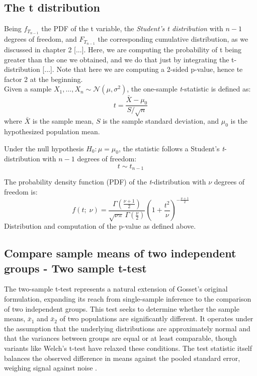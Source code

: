 \documentclass{book}
\begin{document}
\subsection*{The t distribution}

Being $f_{T_{n-1}}$ the PDF of the t variable, the \textit{Student's t distribution} with $n - 1$ degrees of freedom, and $F_{T_{n-1}}$ the corresponding cumulative distribution, as we discussed in chapter 2 [...]. Here, we are computing the probability of t being greater than the one we obtained, and we do that just by integrating the t-distribution [...]. Note that here we are computing a 2-sided p-value, hence te factor 2 at the beginning.\\

Given a sample \( X_1, \ldots, X_n \sim \mathcal{N}(\mu, \sigma^2) \), the one-sample \textit{t}-statistic is defined as:
\[
t = \frac{\bar{X} - \mu_0}{S / \sqrt{n}}
\]
where \( \bar{X} \) is the sample mean, \( S \) is the sample standard deviation, and \( \mu_0 \) is the hypothesized population mean.

Under the null hypothesis \( H_0: \mu = \mu_0 \), the statistic follows a Student's \textit{t}-distribution with \( n-1 \) degrees of freedom:
\[
t \sim t_{n-1}
\]

The probability density function (PDF) of the \textit{t}-distribution with \( \nu \) degrees of freedom is:
\begin{equation}
	f(t; \; \nu) = \frac{\Gamma\left(\frac{\nu+1}{2}\right)}{\sqrt{\nu \pi} \, \Gamma\left(\frac{\nu}{2}\right)} \left(1 + \frac{t^2}{\nu}\right)^{-\frac{\nu+1}{2}}
\end{equation}
Distribution and computation of the p-value as defined above.

\newpage

\subsection{Compare sample means of two independent groups - Two sample t-test}

The two-sample t-test represents a natural extension of Gosset's original formulation, expanding its reach from single-sample inference to the comparison of two independent groups. This test seeks to determine whether the sample means, $\bar{x}_1$ and $\bar{x}_2$ of two populations are significantly different. It operates under the assumption that the underlying distributions are approximately normal and that the variances between groups are equal or at least comparable, though variants like Welch’s t-test have relaxed these conditions. The test statistic itself balances the observed difference in means against the pooled standard error, weighing signal against noise \cite{welch1947}.\\
\end{document}
